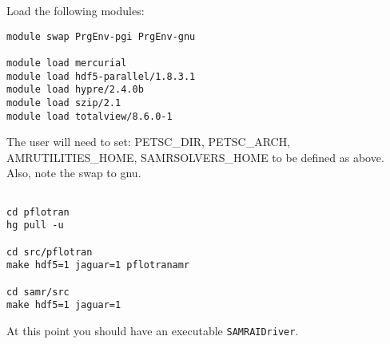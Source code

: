 \documentclass[12pt]{article}
\begin{document}
\noindent
Load the following modules:
\begin{verbatim}
module swap PrgEnv-pgi PrgEnv-gnu
 
module load mercurial
module load hdf5-parallel/1.8.3.1
module load hypre/2.4.0b
module load szip/2.1
module load totalview/8.6.0-1
\end{verbatim}


\noindent
The user will need to set: PETSC\_DIR, PETSC\_ARCH, AMRUTILITIES\_HOME, SAMRSOLVERS\_HOME
to be defined as above. Also, note the swap to gnu.
\begin{verbatim}
 
cd pflotran
hg pull -u

cd src/pflotran
make hdf5=1 jaguar=1 pflotranamr

cd samr/src
make hdf5=1 jaguar=1
\end{verbatim}
At this point you should have an executable \verb|SAMRAIDriver|.
 

 
\end{document}
